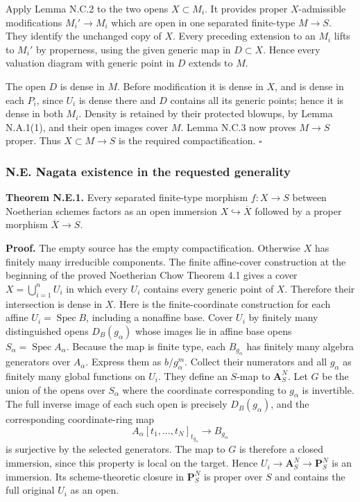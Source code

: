 \documentclass[11pt]{article}
\begin{document}
Apply Lemma N.C.2 to the two opens \(X\subset M_i\). It provides proper
\(X\)-admissible modifications \(M_i'\to M_i\) which are open in one
separated finite-type \(M\to S\). They identify the unchanged copy of
\(X\). Every preceding extension to an \(M_i\) lifts to \(M_i'\) by
properness, using the given generic map in \(D\subset X\). Hence every
valuation diagram with generic point in \(D\) extends to \(M\).

The open \(D\) is dense in \(M\). Before modification it is dense in
\(X\), and is dense in each \(P_i\), since \(U_i\) is dense there and
\(D\) contains all its generic points; hence it is dense in both
\(M_i\). Density is retained by their protected blowups, by Lemma
N.A.1(1), and their open images cover \(M\). Lemma N.C.3 now proves
\(M\to S\) proper. Thus \(X\subset M\to S\) is the required
compactification. \(\square\)

\subsubsection{N.E. Nagata existence in the requested
generality}\label{n.e.-nagata-existence-in-the-requested-generality}

\textbf{Theorem N.E.1.} Every separated finite-type morphism
\(f:X\to S\) between Noetherian schemes factors as an open immersion
\(X\hookrightarrow\overline X\) followed by a proper morphism
\(\overline X\to S\).

\textbf{Proof.} The empty source has the empty compactification.
Otherwise \(X\) has finitely many irreducible components. The finite
affine-cover construction at the beginning of the proved Noetherian Chow
Theorem 4.1 gives a cover \(X=\bigcup_{i=1}^n U_i\) in which every
\(U_i\) contains every generic point of \(X\). Therefore their
intersection is dense in \(X\). Here is the finite-coordinate
construction for each affine \(U_i=\operatorname{Spec}B\), including a
nonaffine base. Cover \(U_i\) by finitely many distinguished opens
\(D_B(g_\alpha)\) whose images lie in affine base opens
\(S_\alpha=\operatorname{Spec}A_\alpha\). Because the map is finite
type, each \(B_{g_\alpha}\) has finitely many algebra generators over
\(A_\alpha\). Express them as \(b/g_\alpha^m\). Collect their numerators
and all \(g_\alpha\) as finitely many global functions on \(U_i\). They
define an \(S\)-map to \(\mathbf A^N_S\). Let \(G\) be the union of the
opens over \(S_\alpha\) where the coordinate corresponding to
\(g_\alpha\) is invertible. The full inverse image of each such open is
precisely \(D_B(g_\alpha)\), and the corresponding coordinate-ring map
\[
A_\alpha[t_1,\ldots,t_N]_{t_{g_\alpha}}
\longrightarrow B_{g_\alpha}
\] is surjective by the selected generators. The map to \(G\) is
therefore a closed immersion, since this property is local on the
target. Hence \(U_i\to\mathbf A^N_S\to\mathbf P^N_S\) is an immersion.
Its scheme-theoretic closure in \(\mathbf P^N_S\) is proper over \(S\)
and contains the full original \(U_i\) as an open.
\end{document}
